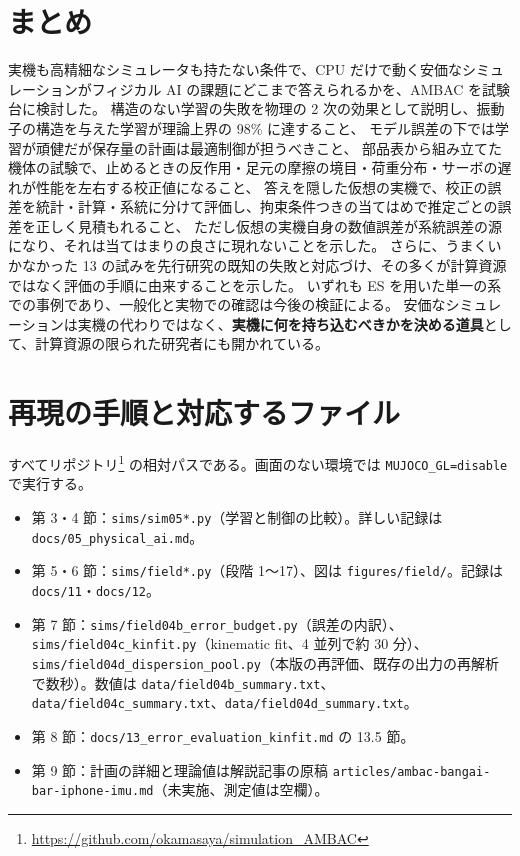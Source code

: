 \documentclass[paper=a4paper,fontsize=10pt,twocolumn,column_gap=2zw,line_length=24zw,number_of_lines=46,head_space=20mm]{jlreq}
\newcommand{\repo}{https://github.com/okamasaya/simulation_AMBAC}
\begin{document}
\section{まとめ}

実機も高精細なシミュレータも持たない条件で、CPU だけで動く安価なシミュレーションがフィジカル AI の課題にどこまで答えられるかを、AMBAC を試験台に検討した。
構造のない学習の失敗を物理の 2 次の効果として説明し、振動子の構造を与えた学習が理論上界の 98\% に達すること、
モデル誤差の下では学習が頑健だが保存量の計画は最適制御が担うべきこと、
部品表から組み立てた機体の試験で、止めるときの反作用・足元の摩擦の境目・荷重分布・サーボの遅れが性能を左右する校正値になること、
答えを隠した仮想の実機で、校正の誤差を統計・計算・系統に分けて評価し、拘束条件つきの当てはめで推定ごとの誤差を正しく見積もれること、
ただし仮想の実機自身の数値誤差が系統誤差の源になり、それは当てはまりの良さに現れないことを示した。
さらに、うまくいかなかった 13 の試みを先行研究の既知の失敗と対応づけ、その多くが計算資源ではなく評価の手順に由来することを示した。
いずれも ES を用いた単一の系での事例であり、一般化と実物での確認は今後の検証による。
安価なシミュレーションは実機の代わりではなく、\textbf{実機に何を持ち込むべきかを決める道具}として、計算資源の限られた研究者にも開かれている。

\appendix
\section{再現の手順と対応するファイル}
\small
すべてリポジトリ\footnote{\url{\repo}} の相対パスである。画面のない環境では \texttt{MUJOCO\_GL=disable} で実行する。
\begin{itemize}\setlength{\itemsep}{0pt}
\item 第 3・4 節：\texttt{sims/sim05*.py}（学習と制御の比較）。詳しい記録は \texttt{docs/05\_physical\_ai.md}。
\item 第 5・6 節：\texttt{sims/field*.py}（段階 1〜17）、図は \texttt{figures/field/}。記録は \texttt{docs/11}・\texttt{docs/12}。
\item 第 7 節：\texttt{sims/field04b\_error\_budget.py}（誤差の内訳）、\texttt{sims/field04c\_kinfit.py}（kinematic fit、4 並列で約 30 分）、
\texttt{sims/field04d\_dispersion\_pool.py}（本版の再評価、既存の出力の再解析で数秒）。数値は \texttt{data/field04b\_summary.txt}、\texttt{data/field04c\_summary.txt}、\texttt{data/field04d\_summary.txt}。
\item 第 8 節：\texttt{docs/13\_error\_evaluation\_kinfit.md} の 13.5 節。
\item 第 9 節：計画の詳細と理論値は解説記事の原稿 \texttt{articles/ambac-bangai-bar-iphone-imu.md}（未実施、測定値は空欄）。
\end{itemize}
\end{document}
